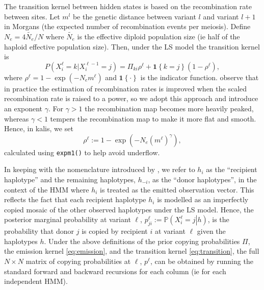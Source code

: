 \documentclass[pdflatex,referee,lineno,sn-nature]{sn-jnl}%
\newcommand{\pkg}[1]{{\fontseries{m}\fontseries{b}\selectfont #1}}
\begin{document}
The transition kernel between hidden states is based on the recombination rate between sites.
Let \(m^l\) be the genetic distance between variant \(l\) and variant \(l+1\) in Morgans (the expected number of recombination events per meiosis).
Define \(N_e = 4\tilde{N_e}/N\) where \(\tilde{N_e}\) is the effective diploid population size (ie half of the haploid effective population size).
Then, under the LS model the transition kernel is
\begin{equation}
	P(X_{i}^\ell = k | X_{i}^{\ell-1} = j)
	= \Pi_{ki} \rho^\ell + \mathbf{1}\left\{k = j\right\} \left(1-\rho^\ell\right) ,
	\label{eq:transition}
\end{equation}
where \(\rho^\ell = 1-\exp\left(-N_e m^\ell\right)\) and \(\mathbf{1}\left\{\cdot\right\}\) is the indicator function.
\cite{Li2213} observe that in practice the estimation of recombination rates is improved when the scaled recombination rate is raised to a power, so we adopt this approach and introduce an exponent \(\gamma\).
For \(\gamma>1\) the recombination map becomes more heavily peaked, whereas \(\gamma<1\) tempers the recombination map to make it more flat and smooth.
Hence, in \pkg{kalis}, we set
\begin{equation}
	\rho^\ell := 1-\exp\left(-N_e \left(m^\ell\right)^\gamma\right), \label{eq:rho}
\end{equation}
calculated using \texttt{expm1()} to help avoid underflow.

In keeping with the nomenclature introduced by \cite{lawson2012inference}, we refer to \(h_i\) as the ``recipient haplotype'' and the remaining haplotypes, \(h_{-i}\), as the ``donor haplotypes'', in the context of the HMM where \(h_{i}\) is treated as the emitted observation vector.
This reflects the fact that each recipient haplotype \(h_i\) is modelled as an imperfectly copied mosaic of the other observed haplotypes under the LS model.
Hence, the posterior marginal probability at variant \(\ell\), \(p^{\ell}_{ji} := \mathbb{P}\left(\left. X_i^\ell = j \right| h\right)\), is the probability that donor \(j\) is copied by recipient \(i\) at variant \(\ell\) given the haplotypes \(h\).
Under the above definitions of the prior copying probabilities \(\Pi\), the emission kernel \eqref{eq:emission}, and the transition kernel \eqref{eq:transition}, the full \(N \times N\) matrix of copying probabilities at \(\ell\), \(p^\ell\), can be obtained by running the standard forward and backward recursions \cite{rabiner1989tutorial} for each column (ie for each independent HMM).
\end{document}
